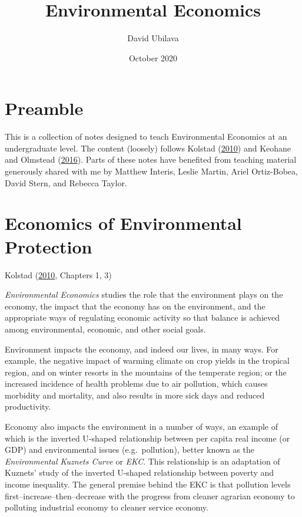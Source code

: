 \documentclass[
]{book}
\title{Environmental Economics}
\author{David Ubilava}
\date{October 2020}
\begin{document}
\maketitle

{
\setcounter{tocdepth}{1}
\tableofcontents
}
\hypertarget{preamble}{%
\chapter*{Preamble}\label{preamble}}

This is a collection of notes designed to teach Environmental Economics at an undergraduate level. The content (loosely) follows Kolstad (\protect\hyperlink{ref-kolstad2010}{2010}) and Keohane and Olmstead (\protect\hyperlink{ref-keohane2016}{2016}). Parts of these notes have benefited from teaching material generously shared with me by Matthew Interis, Leslie Martin, Ariel Ortiz-Bobea, David Stern, and Rebecca Taylor.

\hypertarget{economics-of-environmental-protection}{%
\chapter{Economics of Environmental Protection}\label{economics-of-environmental-protection}}

Kolstad (\protect\hyperlink{ref-kolstad2010}{2010}, Chapters 1, 3)

\emph{Environmental Economics} studies the role that the environment plays on the economy, the impact that the economy has on the environment, and the appropriate ways of regulating economic activity so that balance is achieved among environmental, economic, and other social goals.

Environment impacts the economy, and indeed our lives, in many ways. For example, the negative impact of warming climate on crop yields in the tropical region, and on winter resorts in the mountains of the temperate region; or the increased incidence of health problems due to air pollution, which causes morbidity and mortality, and also results in more sick days and reduced productivity.

Economy also impacts the environment in a number of ways, an example of which is the inverted U-shaped relationship between per capita real income (or GDP) and environmental issues (e.g.~pollution), better known as the \emph{Environmental Kuznets Curve} or \emph{EKC}. This relationship is an adaptation of Kuznets' study of the inverted U-shaped relationship between poverty and income inequality. The general premise behind the EKC is that pollution levels first--increase--then--decrease with the progress from cleaner agrarian economy to polluting industrial economy to cleaner service economy.
\end{document}
